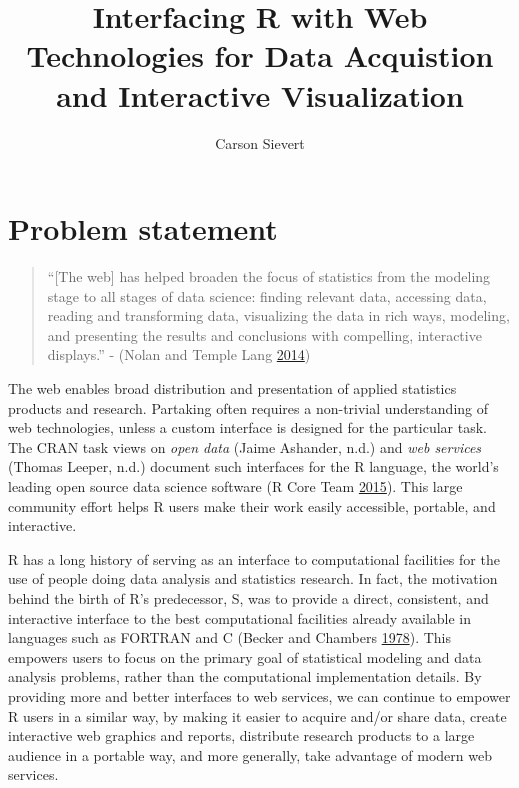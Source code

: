 \documentclass[12pt,]{isuthesis}
\title{Interfacing R with Web Technologies for Data Acquistion and Interactive
Visualization}
\author{Carson Sievert}
\date{}
\begin{document}
\maketitle

{
\setcounter{tocdepth}{2}
\tableofcontents
}
\listoftables
\cleardoublepage {} {}
\listoffigures

\cleardoublepage {}

\newpage
{}
\chapter{Problem statement}

\begin{quote}
``{[}The web{]} has helped broaden the focus of statistics from the
modeling stage to all stages of data science: finding relevant data,
accessing data, reading and transforming data, visualizing the data in
rich ways, modeling, and presenting the results and conclusions with
compelling, interactive displays.'' - (Nolan and Temple Lang
\protect\hyperlink{ref-nolan-lang}{2014})
\end{quote}

The web enables broad distribution and presentation of applied
statistics products and research. Partaking often requires a non-trivial
understanding of web technologies, unless a custom interface is designed
for the particular task. The CRAN task views on \emph{open data} (Jaime
Ashander, n.d.) and \emph{web services} (Thomas Leeper, n.d.) document
such interfaces for the R language, the world's leading open source data
science software (R Core Team \protect\hyperlink{ref-RCore}{2015}). This
large community effort helps R users make their work easily accessible,
portable, and interactive.

R has a long history of serving as an interface to computational
facilities for the use of people doing data analysis and statistics
research. In fact, the motivation behind the birth of R's predecessor,
S, was to provide a direct, consistent, and interactive interface to the
best computational facilities already available in languages such as
FORTRAN and C (Becker and Chambers
\protect\hyperlink{ref-S:1978}{1978}). This empowers users to focus on
the primary goal of statistical modeling and data analysis problems,
rather than the computational implementation details. By providing more
and better interfaces to web services, we can continue to empower R
users in a similar way, by making it easier to acquire and/or share
data, create interactive web graphics and reports, distribute research
products to a large audience in a portable way, and more generally, take
advantage of modern web services.
\end{document}
